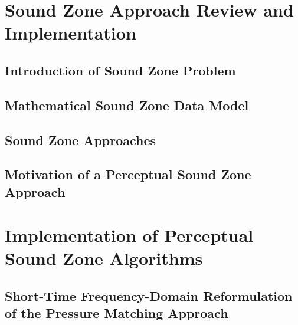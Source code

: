 \documentclass[10pt,twoside,openright,titlepage]{ce}
\begin{document}
\chapter{Sound Zone Approach Review and Implementation}
\label{ch:sound_zone}
% 
\section{Introduction of Sound Zone Problem}
\label{ch:sound_zone:problem}

\newpage
\section{Mathematical Sound Zone Data Model}
\label{ch:sound_zone:data_model}

\newpage
\section{Sound Zone Approaches}
\label{ch:sound_zone:approaches}

\newpage
\section{Motivation of a Perceptual Sound Zone Approach}
\label{ch:sound_zone:approach_selection}

\newpage
% 

\chapter{Implementation of Perceptual Sound Zone Algorithms}
\label{ch:perceptual_sound_zone}

\newpage
\section{Short-Time Frequency-Domain Reformulation of the Pressure Matching Approach}
\label{ch:perceptual_sound_zone:block_based}

\newpage
% 
\end{document}
